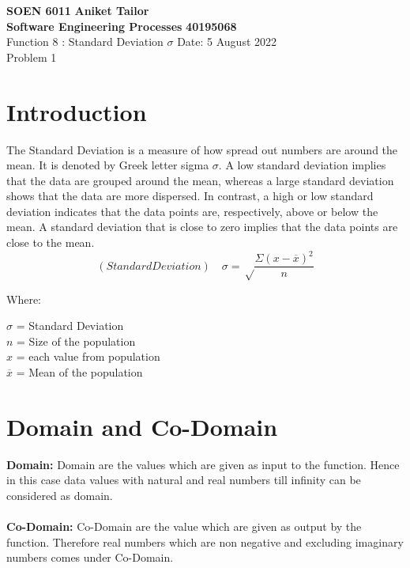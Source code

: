 \documentclass[a4paper, 12pt]{article}
\begin{document}
\noindent
\large\textbf{SOEN 6011} \hfill \textbf{Aniket Tailor}\\
\large\textbf{Software Engineering Processes} \hfill \textbf{40195068} \\
Function 8 : Standard Deviation $\sigma$ \hfill Date: 5 August 2022\\
\normalsize Problem 1 \\

\section{Introduction}
The Standard Deviation is a measure of how spread out numbers are around the mean. It is denoted by Greek letter sigma $\sigma$. A low standard deviation implies that the data are grouped around the mean, whereas a large standard deviation shows that the data are more dispersed. In contrast, a high or low standard deviation indicates that the data points are, respectively, above or below the mean. A standard deviation that is close to zero implies that the data points are close to the mean.\\
\begin{equation*}
   (Standard Deviation) \quad \sigma = \sqrt\frac{{\Sigma (x- \overline{x})^2}}{n}
  \end{equation*}
  
Where:
    \begin{itemize}
        $\sigma$ = Standard Deviation\\
        $n$ = Size of the population\\
        $x$ = each value from population \\
        $\overline{x}$ = Mean of the population\\
    \end{itemize}

\section{Domain and Co-Domain}
\textbf{Domain:} Domain are the values which are given as input to the function. Hence in this case data values with natural and real numbers till infinity can be considered as domain.\\\\
\textbf{Co-Domain:} Co-Domain are the value which are given as output by the function. Therefore real numbers which are non negative and excluding imaginary numbers comes under Co-Domain. 
\end{document}
